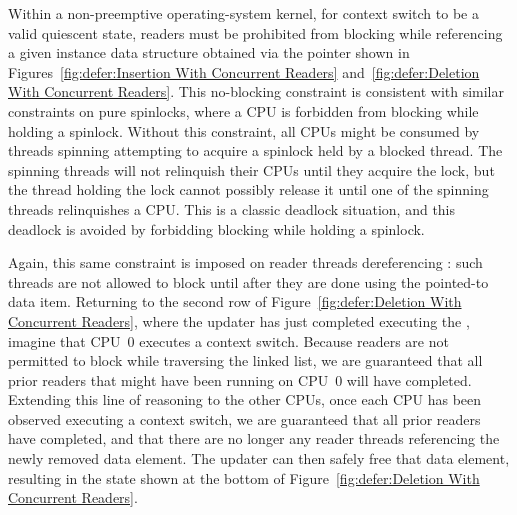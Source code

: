 Within a non-preemptive operating-system kernel, for context switch to be
a valid quiescent state, readers must be prohibited from blocking while
referencing a given instance data structure obtained via the 
pointer shown in
Figures~\ref{fig:defer:Insertion With Concurrent Readers}
and~\ref{fig:defer:Deletion With Concurrent Readers}.
This no-blocking constraint is consistent with similar constraints
on pure spinlocks, where a CPU is forbidden from blocking while
holding a spinlock.
Without this constraint, all CPUs might be consumed by threads
spinning attempting to acquire a spinlock held by a blocked thread.
The spinning threads will not relinquish their CPUs until they acquire
the lock, but the thread holding the lock cannot possibly release it
until one of the spinning threads relinquishes a CPU\@.
This is a classic deadlock situation, and this deadlock is avoided
by forbidding blocking while holding a spinlock.

Again, this same constraint is imposed on reader threads dereferencing
: such threads are not allowed to block until after
they are done using the pointed-to data item.
Returning to the second row of
Figure~\ref{fig:defer:Deletion With Concurrent Readers},
where the updater has just completed executing the ,
imagine that CPU~0 executes a context switch.
Because readers are not permitted to block while traversing the linked
list, we are guaranteed that all prior readers that might have been running on
CPU~0 will have completed.
Extending this line of reasoning to the other CPUs, once each CPU has
been observed executing a context switch, we are guaranteed that all
prior readers have completed, and that there are no longer any reader
threads referencing the newly removed data element.
The updater can then safely free that data element, resulting in the
state shown at the bottom of
Figure~\ref{fig:defer:Deletion With Concurrent Readers}.

